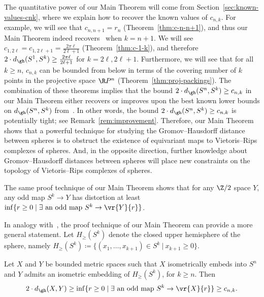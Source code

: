 \documentclass[11pt, reqno, english]{amsart}
\begin{document}
The quantitative power of our Main Theorem will come from Section~\ref{sec:known-values-cnk}, where we explain how to recover the known values of $c_{n,k}$.
For example, we will see that $c_{n,n+1}=r_n$ (Theorem~\ref{thm:c-n-n+1}), and thus our Main Theorem indeed recovers~\cite[Theorem~B]{lim2021gromov} when $k=n+1$.
We will see $c_{1,2\ell}=c_{1,2\ell+1}=\tfrac{2\pi \ell}{2\ell+1}$ (Theorem~\ref{thm:c-1-k}), and therefore $2\cdot d_{\gh}(S^1,S^k) \ge \tfrac{2\pi \ell}{2\ell+1}$ for $k=2\ell,2\ell+1$.
Furthermore, we will see that for all $k\ge n$, $c_{n,k}$ can be bounded from below in terms of the covering number of $k$ points in the projective space $\R P^n$ (Theorem~\ref{thm:proj-packings}).
The combination of these theorems implies that the bound $2\cdot d_{\gh}(S^n, S^k) \ge c_{n,k}$ in our Main Theorem either recovers or improves upon the best known lower bounds on $d_{\gh}(S^n, S^k)$ from~\cite{lim2021gromov}.
In other words, the bound $2\cdot d_{\gh}(S^n, S^k) \ge c_{n,k}$ is potentially tight; see Remark~\ref{rem:improvement}.
Therefore, our Main Theorem shows that a powerful technique for studying the Gromov--Hausdorff distance between spheres is to obstruct the existence of equivariant maps to Vietoris--Rips complexes of spheres.
And, in the opposite direction, further knowledge about Gromov--Hausdorff distances between spheres will place new constraints on the topology of Vietoris--Rips complexes of spheres.

\begin{remark}
\label{rem:odd-distortion-bound}
The same proof technique of our Main Theorem shows that for any $\Z/2$ space $Y$, any odd map $S^k \to Y$ has distortion at least $\inf\{r\ge 0 \mid \exists\text{ an odd map }S^k \to \vr{Y}{r}\}$.
\end{remark}

In analogy with~\cite[Theorem D]{lim2021gromov}, the proof technique of our Main Theorem 
can provide a more general statement.
Let $H_\ge(S^k)$ denote the closed upper hemisphere of the sphere, namely $H_\ge(S^k)\coloneqq \{(x_1,\ldots,x_{k+1})\in S^k~|~x_{k+1}\ge 0\}$.

\begin{theorem}
Let $X$ and $Y$ be bounded metric spaces such that $X$ isometrically embeds into $S^n$ and $Y$ admits an isometric embedding of $H_\ge(S^k)$, for $k \ge n$.
Then
\[2\cdot d_{\gh}(X, Y) \geq \inf\{r\ge 0 \mid \exists\text{ an odd map }S^k \to \vr{X}{r}\} \geq c_{n,k}.\]
\end{theorem}
\end{document}
